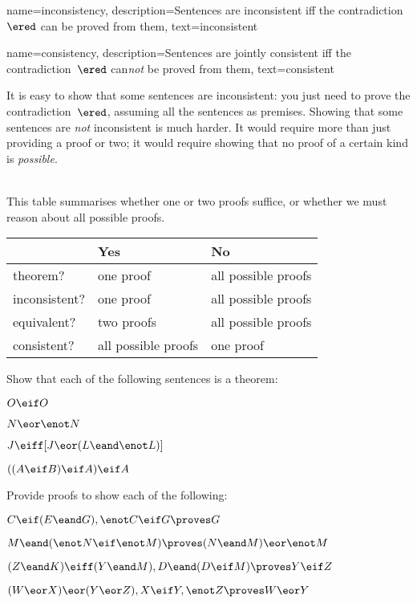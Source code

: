 {    name={inconsistency}, 
  description={Sentences are inconsistent iff the contradiction~$\ered$ can be proved from them},
    text={inconsistent}
}

{    name={consistency}, 
  description={Sentences are jointly consistent iff the contradiction~$\ered$ can\emph{not} be proved from them},
    text={consistent}
}

It is easy to show that some sentences are inconsistent: you just need
to prove the contradiction~$\ered$, assuming all the sentences as
premises. Showing that some sentences are \emph{not} inconsistent is much
harder. It would require more than just providing a proof or two; it
would require showing that no proof of a certain kind is
\emph{possible}.

\
\\
This table summarises whether one or two proofs suffice, or whether we must reason about all possible proofs.

\begin{center}
\begin{tabular}{l l l}
 & \textbf{Yes} & \textbf{No}\\
 \hline
theorem? & one proof & all possible proofs\\
inconsistent? &  one proof  & all possible proofs\\
equivalent? & two proofs & all possible proofs\\
consistent? & all possible proofs & one proof\\
\end{tabular}
\end{center}


\practiceproblems
\problempart
Show that each of the following sentences is a theorem:
\begin{earg}
\item $O \eif O$
\item $N \eor \enot N$
\item $J \eiff [J\eor (L\eand\enot L)]$
\item $((A \eif B) \eif A) \eif A$ 
\end{earg}

\problempart
Provide proofs to show each of the following:
\begin{earg}
\item $C\eif(E\eand G), \enot C \eif G \proves G$
\item $M \eand (\enot N \eif \enot M) \proves (N \eand M) \eor \enot M$
\item $(Z\eand K)\eiff(Y\eand M), D\eand(D\eif M) \proves Y\eif Z$
\item $(W \eor X) \eor (Y \eor Z), X\eif Y, \enot Z \proves W\eor Y$
\end{earg}

